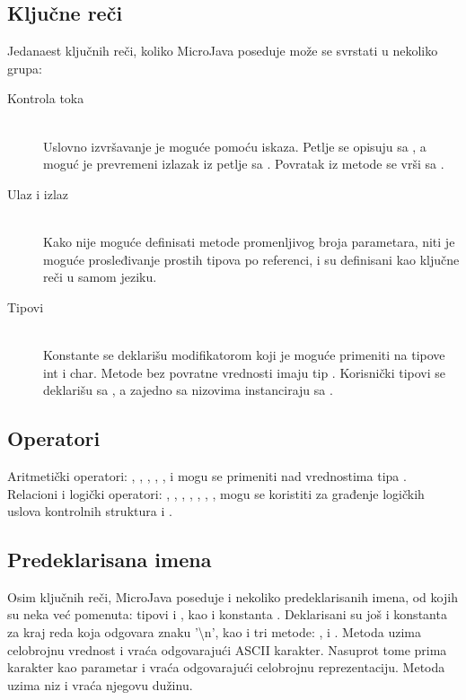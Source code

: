 \subsection*{Ključne reči}

Jedanaest ključnih reči, koliko MicroJava poseduje može se svrstati u nekoliko grupa:

\begin{description}
    \item[Kontrola toka] \hfill \\
    Uslovno izvršavanje je moguće pomoću  iskaza. 
    Petlje se opisuju sa , a moguć je prevremeni izlazak iz petlje sa . 
    Povratak iz metode se vrši sa .

   \item[Ulaz i izlaz] \hfill \\
	Kako nije moguće definisati metode promenljivog broja parametara, niti je moguće prosleđivanje prostih tipova po referenci,  i  su definisani kao ključne reči u samom jeziku.

	\item[Tipovi] \hfill \\
	Konstante se deklarišu modifikatorom  koji je moguće primeniti na tipove int i char. 
	Metode bez povratne vrednosti imaju tip . 
	Korisnički tipovi se deklarišu sa , a zajedno sa nizovima instanciraju sa .

\end{description}


\subsection*{Operatori}

Aritmetički operatori: \mj{+}, \mj{-}, \mj{*}, \mj{\%}, \mj{/}, \mj{++} i \mj{--} mogu se primeniti nad vrednostima tipa .
Relacioni i logički operatori: \mj{==}, \mj{>}, \mj{<}, \mj{>=}, \mj{<=}, \mj{!=}, \mj{\&\&}, \mj{||} mogu se koristiti za građenje logičkih uslova kontrolnih struktura  i .

\subsection*{Predeklarisana imena}

Osim ključnih reči, MicroJava poseduje i nekoliko predeklarisanih imena, od kojih su neka već pomenuta: 
	tipovi  i , kao i konstanta . 
Deklarisani su još i konstanta za kraj reda  koja odgovara znaku '\textbackslash n', 
	kao i tri metode: ,  i . 
Metoda   uzima celobrojnu vrednost i vraća odgovarajući ASCII karakter. 
Nasuprot tome  prima karakter kao parametar i vraća odgovarajući celobrojnu reprezentaciju. 
Metoda  uzima niz i vraća njegovu dužinu. 

